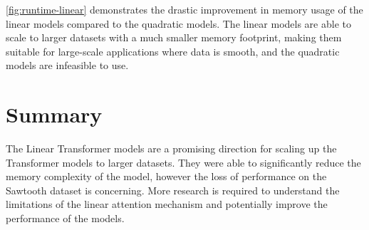 \documentclass[../../main.tex]{subfiles}
\begin{document}
\autoref{fig:runtime-linear} demonstrates the drastic improvement in memory usage of the linear models compared to the quadratic models. The linear models are able to scale to larger datasets with a much smaller memory footprint, making them suitable for large-scale applications where data is smooth, and the quadratic models are infeasible to use. 

\section{Summary}

The Linear Transformer models are a promising direction for scaling up the Transformer models to larger datasets. They were able to significantly reduce the memory complexity of the model, however the loss of performance on the Sawtooth dataset is concerning. More research is required to understand the limitations of the linear attention mechanism and potentially improve the performance of the models.



\ifSubfilesClassLoaded{%
    \printbibliography{}
}{} 
\end{document}
